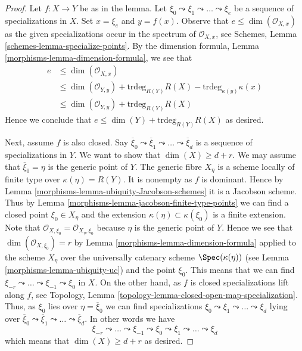 \begin{proof}

Let $f : X \to Y$ be as in the lemma.
Let $\xi_0 \leadsto \xi_1 \leadsto \ldots \leadsto \xi_e$ be
a sequence of specializations in $X$. Set $x = \xi_e$
and $y = f(x)$. Observe that $e \leq \dim(\mathcal{O}_{X, x})$
as the given specializations occur in the spectrum of
$\mathcal{O}_{X, x}$, see Schemes, Lemma \ref{schemes-lemma-specialize-points}.
By the dimension formula, Lemma \ref{morphisms-lemma-dimension-formula},
we see that
\begin{align*}
e & \leq \dim(\mathcal{O}_{X, x}) \\
& \leq \dim(\mathcal{O}_{Y, y}) +
\text{trdeg}_{R(Y)} R(X) - \text{trdeg}_{\kappa(y)} \kappa(x) \\
& \leq \dim(\mathcal{O}_{Y, y}) + \text{trdeg}_{R(Y)} R(X)
\end{align*}
Hence we conclude that $e \leq \dim(Y) + \text{trdeg}_{R(Y)} R(X)$ as desired.

\medskip\noindent
Next, assume $f$ is also closed.
Say $\overline{\xi}_0 \leadsto \overline{\xi}_1 \leadsto \ldots
\leadsto \overline{\xi}_d$ is a sequence of specializations in $Y$.
We want to show that $\dim(X) \geq d + r$.
We may assume that $\overline{\xi}_0 = \eta$ is the generic point of $Y$.
The generic fibre $X_\eta$ is a scheme locally of finite type over
$\kappa(\eta) = R(Y)$. It is nonempty as $f$ is dominant. Hence by
Lemma \ref{morphisms-lemma-ubiquity-Jacobson-schemes} it is a Jacobson scheme.
Thus by Lemma \ref{morphisms-lemma-jacobson-finite-type-points}
we can find a closed point $\xi_0 \in X_\eta$ and the extension
$\kappa(\eta) \subset \kappa(\xi_0)$ is
a finite extension. Note that
$\mathcal{O}_{X, \xi_0} = \mathcal{O}_{X_\eta, \xi_0}$ because
$\eta$ is the generic point of $Y$. Hence we see that
$\dim(\mathcal{O}_{X, \xi_0}) = r$ by Lemma \ref{morphisms-lemma-dimension-formula}
applied to the scheme $X_\eta$ over the universally catenary
scheme $\Spec(\kappa(\eta))$ (see Lemma \ref{morphisms-lemma-ubiquity-uc})
and the point $\xi_0$. This means that we can find
$\xi_{-r} \leadsto \ldots \leadsto \xi_{-1} \leadsto \xi_0$
in $X$. On the other hand, as $f$ is closed specializations
lift along $f$, see
Topology, Lemma \ref{topology-lemma-closed-open-map-specialization}.
Thus, as $\xi_0$ lies
over $\eta = \overline{\xi}_0$ we can
find specializations $\xi_0 \leadsto \xi_1 \leadsto \ldots \leadsto \xi_d$
lying over $\overline{\xi}_0 \leadsto \overline{\xi}_1 \leadsto \ldots
\leadsto \overline{\xi}_d$. In other words we have
$$
\xi_{-r} \leadsto \ldots \leadsto \xi_{-1} \leadsto \xi_0
\leadsto \xi_1 \leadsto \ldots \leadsto \xi_d
$$
which means that $\dim(X) \geq d + r$ as desired.
\end{proof}

